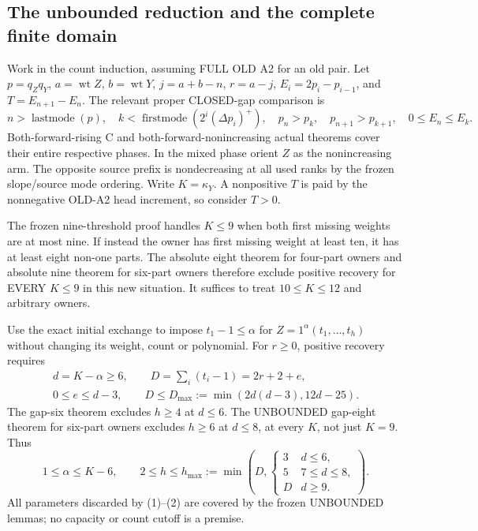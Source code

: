 \documentclass[11pt]{article}
\begin{document}
\subsection{The unbounded reduction and the complete finite domain}
Work in the count induction, assuming FULL OLD A2 for an old pair.
Let $p=q_Zq_Y$, $a=\operatorname{wt}Z$, $b=\operatorname{wt}Y$,
$j=a+b-n$, $r=a-j$, $E_i=2p_i-p_{i-1}$, and
$T=E_{n+1}-E_n$. The relevant proper CLOSED-gap comparison is
\[
 n>\operatorname{lastmode}(p),\quad k<\operatorname{firstmode}(2^i(\Delta p_i)^+),
 \quad p_n>p_k,\quad p_{n+1}>p_{k+1},\quad 0\le E_n\le E_k.
\]
Both-forward-rising C and both-forward-nonincreasing actual theorems
cover their entire respective phases. In the mixed phase orient $Z$ as
the nonincreasing arm. The opposite source prefix is nondecreasing at
all used ranks by the frozen slope/source mode ordering. Write
$K=\kappa_Y$. A nonpositive $T$ is paid by the nonnegative OLD-A2
head increment, so consider $T>0$.

The frozen nine-threshold proof handles $K\le9$ when both first
missing weights are at most nine. If instead the owner has first missing
weight at least ten, it has at least eight non-one parts. The absolute
eight theorem for four-part owners and absolute nine theorem for six-part
owners therefore exclude positive recovery for EVERY $K\le9$ in this
new situation. It suffices to treat $10\le K\le12$ and arbitrary owners.

Use the exact initial exchange to impose $t_1-1\le\alpha$ for
$Z=1^\alpha(t_1,\ldots,t_h)$ without changing its weight, count or
polynomial. For $r\ge0$, positive recovery requires
\[
 \begin{gathered}
 d=K-\alpha\ge6,\qquad D=\sum_i(t_i-1)=2r+2+e,\\
 0\le e\le d-3,\qquad D\le D_{\max}:=\min(2d(d-3),12d-25).
 \end{gathered}
                                                        \tag{1}
\]
The gap-six theorem excludes $h\ge4$ at $d\le6$.
The UNBOUNDED gap-eight theorem for six-part owners excludes
$h\ge6$ at $d\le8$, at every $K$, not just $K=9$. Thus
\[
 1\le\alpha\le K-6,\qquad
 2\le h\le h_{\max}:=\min\left(D,
 \begin{cases}3&d\le6,\\5&7\le d\le8,\\D&d\ge9.\end{cases}\right).
                                                        \tag{2}
\]
All parameters discarded by (1)--(2) are covered by the frozen
UNBOUNDED lemmas; no capacity or count cutoff is a premise.
\end{document}
